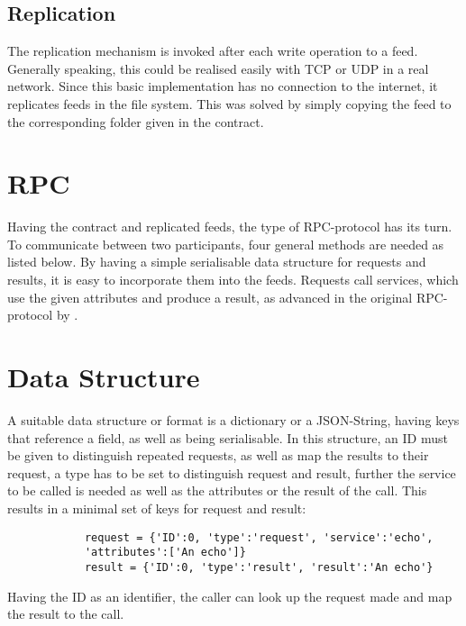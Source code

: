 \subsection{Replication}
The replication mechanism is invoked after each write operation to a feed. Generally speaking, this could be realised easily with TCP or UDP in a real network. Since this basic implementation has no connection to the internet, it replicates feeds in the file system. This was solved by simply copying the feed to the corresponding folder given in the contract.
\section{RPC}
Having the contract and replicated feeds, the type of RPC-protocol has its turn. To communicate between two participants, four general methods are needed as listed below. By having a simple serialisable data structure for requests and results, it is easy to incorporate them into the feeds. Requests call services, which use the given attributes and produce a result, as advanced in the original RPC-protocol by \citet{birrell1984implementing}.
\section{Data Structure}
A suitable data structure or format is a dictionary or a JSON-String, having keys that reference a field, as well as being serialisable. In this structure, an ID must be given to distinguish repeated requests, as well as map the results to their request, a type has to be set to distinguish request and result, further the service to be called is needed as well as the attributes or the result of the call. This results in a minimal set of keys for request and result:\\

    \begin{python}
        \begin{lstlisting}
            request = {'ID':0, 'type':'request', 'service':'echo', 
            'attributes':['An echo']}
            result = {'ID':0, 'type':'result', 'result':'An echo'}
        \end{lstlisting}
    \end{python}
    



Having the ID as an identifier, the caller can look up the request made and map the result to the call.
